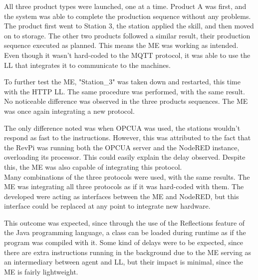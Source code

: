 All three product types were launched, one at a time. Product A was first, and the system was able to complete the production sequence without any problems. The product first went to Station 3, the station applied the skill, and then moved on to storage. The other two products followed a similar result, their production sequence executed as planned. This means the \acrlong{ME} was working as intended. Even though it wasn't hard-coded to the \acrshort{MQTT} protocol, it was able to use the \acrlong{LL} that integrates it to communicate to the machines.

To further test the \acrshort{ME}, "Station\_3" was taken down and restarted, this time with the \acrshort{HTTP} \acrlong{LL}. The same procedure was performed, with the same result. No noticeable difference was observed in the three products sequences. The \acrshort{ME} was once again integrating a new protocol.

The only difference noted was when \acrshort{OPCUA} was used, the stations wouldn't respond as fast to the instructions. However, this was attributed to the fact that the RevPi was running both the \acrshort{OPCUA} server and the NodeRED instance, overloading its processor. This could easily explain the delay observed. Despite this, the \acrshort{ME} was also capable of integrating this protocol.\\

Many combinations of the three protocols were used, with the same results. The \acrlong{ME} was integrating all three protocols as if it was hard-coded with them. The  developed were acting as interfaces between the \acrshort{ME} and NodeRED, but this interface could be replaced at any point to integrate new hardware.

This outcome was expected, since through the use of the Reflections feature of the Java programming language, a class can be loaded during runtime as if the program was compiled with it. Some kind of delays were to be expected, since there are extra instructions running in the background due to the \acrlong{ME} serving as an intermediary between agent and \acrlong{LL}, but their impact is minimal, since the \acrshort{ME} is fairly lightweight.